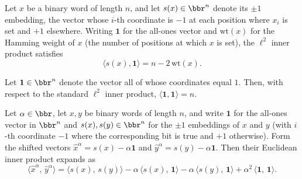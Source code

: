 \begin{lemma}
\label{CodingTheory.Johnson.inner_pmOne_ones}
\leanok
{}
Let $x$ be a binary word of length $n$, and let $s(x) \in \bbr^n$ denote its $\pm1$
embedding, the vector whose $i$-th coordinate is $-1$ at each position where $x_i$ is
set and $+1$ elsewhere. Writing $\mathbf{1}$ for the all-ones vector and
$\mathrm{wt}(x)$ for the Hamming weight of $x$ (the number of positions at which $x$ is
set), the $\ell^2$ inner product satisfies
\[
\langle s(x), \mathbf{1} \rangle = n - 2\,\mathrm{wt}(x).
\]
\end{lemma}

\begin{lemma}
\label{CodingTheory.Johnson.inner_ones_ones}
\leanok
{}
Let $\mathbf{1} \in \bbr^n$ denote the vector all of whose coordinates equal $1$. Then,
with respect to the standard $\ell^2$ inner product, $\langle \mathbf{1}, \mathbf{1}
\rangle = n$.
\end{lemma}

\begin{lemma}
\label{CodingTheory.Johnson.inner_shifted_expand}
\leanok
{}
Let $\alpha \in \bbr$, let $x, y$ be binary words of length $n$, and write $\mathbf{1}$
for the all-ones vector in $\bbr^n$ and $s(x), s(y) \in \bbr^n$ for the $\pm 1$
embeddings of $x$ and $y$ (with $i$-th coordinate $-1$ where the corresponding bit is
true and $+1$ otherwise). Form the shifted vectors $\hat{x}^\alpha = s(x) - \alpha
\mathbf{1}$ and $\hat{y}^\alpha = s(y) - \alpha \mathbf{1}$. Then their Euclidean inner
product expands as
\[
\langle \hat{x}^\alpha,\, \hat{y}^\alpha \rangle
= \langle s(x),\, s(y) \rangle
- \alpha\,\langle s(x),\, \mathbf{1} \rangle
- \alpha\,\langle s(y),\, \mathbf{1} \rangle
+ \alpha^2\,\langle \mathbf{1},\, \mathbf{1} \rangle.
\]
\end{lemma}

